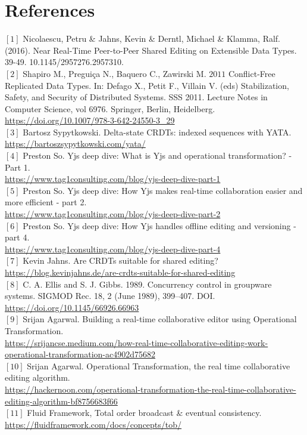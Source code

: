 \documentclass[9pt, titlepage]{article}
\begin{document}
  \section{References}
  \([1]\) Nicolaescu, Petru \& Jahns, Kevin \& Derntl, Michael \& Klamma, Ralf. (2016). Near Real-Time Peer-to-Peer Shared Editing on Extensible Data Types. 39-49. 10.1145/2957276.2957310.
  \\
  \([2]\) Shapiro M., Preguiça N., Baquero C., Zawirski M. \(2011\) Conflict-Free Replicated Data Types. In: Defago X., Petit F., Villain V. (eds) Stabilization, Safety, and Security of Distributed Systems. SSS 2011. Lecture Notes in Computer Science, vol 6976. Springer, Berlin, Heidelberg. 
  \\ \url{https://doi.org/10.1007/978-3-642-24550-3_29}
  \\
  \([3]\) Bartosz Sypytkowski. Delta-state CRDTs: indexed sequences with YATA. 
  \\ \url{https://bartoszsypytkowski.com/yata/}
  \\
  \([4]\) Preston So. Yjs deep dive: What is Yjs and operational transformation? - Part 1. \\ \url{https://www.tag1consulting.com/blog/yjs-deep-dive-part-1}
  \\
  \([5]\) Preston So. Yjs deep dive: How Yjs makes real-time collaboration easier and more efficient - part 2. \\ \url{https://www.tag1consulting.com/blog/yjs-deep-dive-part-2}
  \\
  \([6]\) Preston So. Yjs deep dive: How Yjs handles offline editing and versioning - part 4. \\ \url{https://www.tag1consulting.com/blog/yjs-deep-dive-part-4}
  \\
  \([7]\) Kevin Jahns. Are CRDTs suitable for shared editing?\\
  \url{https://blog.kevinjahns.de/are-crdts-suitable-for-shared-editing}
  \\
  \([8]\) C. A. Ellis and S. J. Gibbs. 1989. Concurrency control in groupware systems. SIGMOD Rec. 18, 2 (June 1989), 399–407. DOI. \\
  \url{https://doi.org/10.1145/66926.66963}
  \\
  \([9]\) Srijan Agarwal. Building a real-time collaborative editor using Operational Transformation. \\
  \url{https://srijancse.medium.com/how-real-time-collaborative-editing-work-operational-transformation-ac4902d75682}
  \\
  \([10]\) Srijan Agarwal. Operational Transformation, the real time collaborative editing algorithm. \\
  \url{https://hackernoon.com/operational-transformation-the-real-time-collaborative-editing-algorithm-bf8756683f66}
  \\
  \([11]\) Fluid Framework, Total order broadcast \& eventual consistency. \\
  \url{https://fluidframework.com/docs/concepts/tob/}
\end{document}
